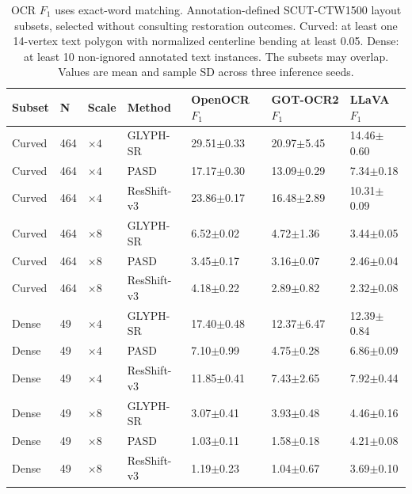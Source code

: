 \begin{table}[H]
\centering
\caption{OCR $F_1$ uses exact-word matching. Annotation-defined SCUT-CTW1500 layout subsets, selected without consulting restoration outcomes. Curved: at least one 14-vertex text polygon with normalized centerline bending at least 0.05. Dense: at least 10 non-ignored annotated text instances. The subsets may overlap. Values are mean and sample SD across three inference seeds.}
\label{tab:ar-layout-ocr}
\small
\setlength{\tabcolsep}{4pt}
\begin{tabular}{lllllll}
\toprule
Subset & N & Scale & Method & OpenOCR $F_1$ & GOT-OCR2 $F_1$ & LLaVA $F_1$ \\
\midrule
Curved & 464 & $\times4$ & GLYPH-SR & 29.51$\pm$0.33 & 20.97$\pm$5.45 & 14.46$\pm$0.60 \\
Curved & 464 & $\times4$ & PASD & 17.17$\pm$0.30 & 13.09$\pm$0.29 & 7.34$\pm$0.18 \\
Curved & 464 & $\times4$ & ResShift-v3 & 23.86$\pm$0.17 & 16.48$\pm$2.89 & 10.31$\pm$0.09 \\
Curved & 464 & $\times8$ & GLYPH-SR & 6.52$\pm$0.02 & 4.72$\pm$1.36 & 3.44$\pm$0.05 \\
Curved & 464 & $\times8$ & PASD & 3.45$\pm$0.17 & 3.16$\pm$0.07 & 2.46$\pm$0.04 \\
Curved & 464 & $\times8$ & ResShift-v3 & 4.18$\pm$0.22 & 2.89$\pm$0.82 & 2.32$\pm$0.08 \\
Dense & 49 & $\times4$ & GLYPH-SR & 17.40$\pm$0.48 & 12.37$\pm$6.47 & 12.39$\pm$0.84 \\
Dense & 49 & $\times4$ & PASD & 7.10$\pm$0.99 & 4.75$\pm$0.28 & 6.86$\pm$0.09 \\
Dense & 49 & $\times4$ & ResShift-v3 & 11.85$\pm$0.41 & 7.43$\pm$2.65 & 7.92$\pm$0.44 \\
Dense & 49 & $\times8$ & GLYPH-SR & 3.07$\pm$0.41 & 3.93$\pm$0.48 & 4.46$\pm$0.16 \\
Dense & 49 & $\times8$ & PASD & 1.03$\pm$0.11 & 1.58$\pm$0.18 & 4.21$\pm$0.08 \\
Dense & 49 & $\times8$ & ResShift-v3 & 1.19$\pm$0.23 & 1.04$\pm$0.67 & 3.69$\pm$0.10 \\
\bottomrule
\end{tabular}
\end{table}
